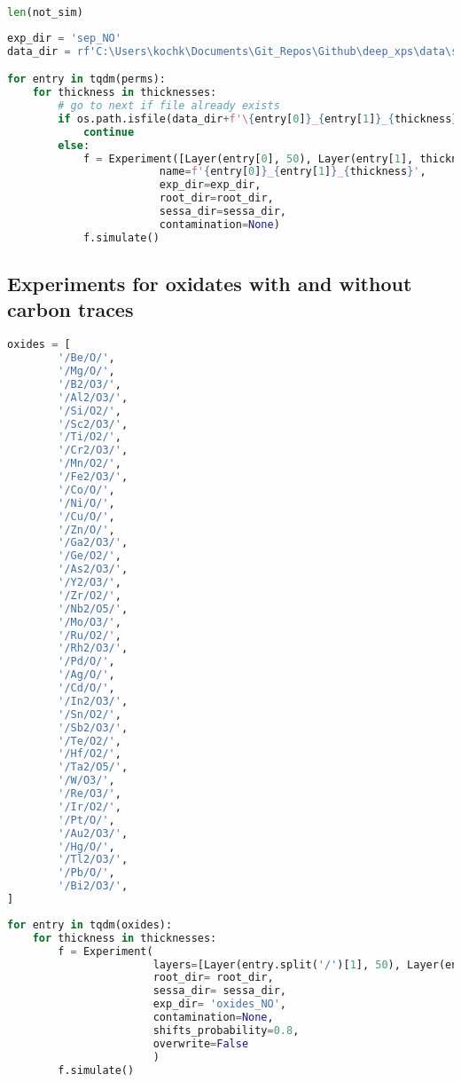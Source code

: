 \begin{lstlisting}[language=Python]
len(not_sim)
\end{lstlisting}

\begin{lstlisting}[language=Python]
exp_dir = 'sep_NO'
data_dir = rf'C:\Users\kochk\Documents\Git_Repos\Github\deep_xps\data\simulation_data\{exp_dir}'

for entry in tqdm(perms):
    for thickness in thicknesses:
        # go to next if file already exists
        if os.path.isfile(data_dir+f'\{entry[0]}_{entry[1]}_{thickness}_separate_spectra.spcreg1.spc'):
            continue
        else:
            f = Experiment([Layer(entry[0], 50), Layer(entry[1], thickness)],
                        name=f'{entry[0]}_{entry[1]}_{thickness}',
                        exp_dir=exp_dir,
                        root_dir=root_dir,
                        sessa_dir=sessa_dir,
                        contamination=None)
            f.simulate()
\end{lstlisting}

\hypertarget{experiments-for-oxidates-with-and-without-carbon-traces}{%
\subsection*{Experiments for oxidates with and without carbon
traces}\label{experiments-for-oxidates-with-and-without-carbon-traces}}

\begin{lstlisting}[language=Python]
oxides = [
        '/Be/O/',
        '/Mg/O/',
        '/B2/O3/',
        '/Al2/O3/',
        '/Si/O2/',
        '/Sc2/O3/',
        '/Ti/O2/',
        '/Cr2/O3/',
        '/Mn/O2/',
        '/Fe2/O3/',
        '/Co/O/',
        '/Ni/O/',
        '/Cu/O/',
        '/Zn/O/',
        '/Ga2/O3/',
        '/Ge/O2/',
        '/As2/O3/',
        '/Y2/O3/',
        '/Zr/O2/',
        '/Nb2/O5/',
        '/Mo/O3/',
        '/Ru/O2/',
        '/Rh2/O3/',
        '/Pd/O/',
        '/Ag/O/',
        '/Cd/O/',
        '/In2/O3/',
        '/Sn/O2/',
        '/Sb2/O3/',
        '/Te/O2/',
        '/Hf/O2/',
        '/Ta2/O5/',
        '/W/O3/',
        '/Re/O3/',
        '/Ir/O2/',
        '/Pt/O/',
        '/Au2/O3/',
        '/Hg/O/',
        '/Tl2/O3/',
        '/Pb/O/',
        '/Bi2/O3/',
]
\end{lstlisting}

\begin{lstlisting}[language=Python]
for entry in tqdm(oxides):
    for thickness in thicknesses:
        f = Experiment(
                       layers=[Layer(entry.split('/')[1], 50), Layer(entry, thickness)],
                       root_dir= root_dir,
                       sessa_dir= sessa_dir,
                       exp_dir= 'oxides_NO',
                       contamination=None,
                       shifts_probability=0.8,
                       overwrite=False
                       )
        f.simulate()
\end{lstlisting}

